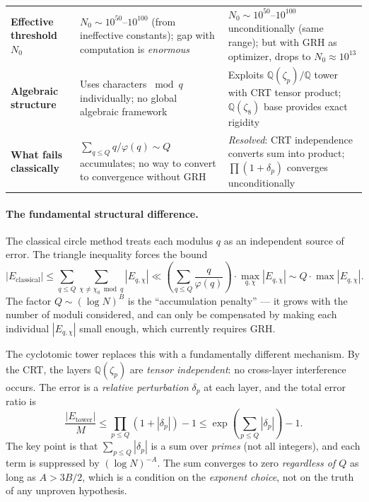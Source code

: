 \documentclass[11pt,a4paper]{article}
\theoremstyle{remark}
\newcommand{\Q}{\mathbb{Q}}
\begin{document}
\begin{table}[ht]
\begin{tabular}{@{}p{3.2cm}|p{5.0cm}|p{5.0cm}@{}}
\textbf{Effective threshold $N_0$}
  & $N_0 \sim 10^{50}$--$10^{100}$ (from ineffective constants); gap with computation is \emph{enormous}
  & $N_0 \sim 10^{50}$--$10^{100}$ unconditionally (same range); but with GRH as optimizer, drops to $N_0 \approx 10^{13}$ \\

\textbf{Algebraic structure}
  & Uses characters $\bmod q$ individually; no global algebraic framework
  & Exploits $\Q(\zeta_p)/\Q$ tower with CRT tensor product; $\Q(\zeta_8)$ base provides exact rigidity \\

\textbf{What fails classically}
  & $\sum_{q \leq Q} q/\varphi(q) \sim Q$ accumulates; no way to convert to convergence without GRH
  & \emph{Resolved}: CRT independence converts sum into product; $\prod(1+\delta_p)$ converges unconditionally \\

\bottomrule
\end{tabular}
\end{table}

\paragraph{The fundamental structural difference.}
The classical circle method treats each modulus $q$ as an independent
source of error.  The triangle inequality forces the bound
\begin{equation}
\label{eq:classical-accumulation}
  |E_{\text{classical}}| \leq \sum_{q \leq Q}\sum_{\chi \neq \chi_0 \bmod q}
    |E_{q,\chi}| \ll \left(\sum_{q \leq Q}\frac{q}{\varphi(q)}\right)
    \cdot \max_{q,\chi}|E_{q,\chi}| \sim Q \cdot \max|E_{q,\chi}|.
\end{equation}
The factor $Q \sim (\log N)^B$ is the ``accumulation penalty'' --- it
grows with the number of moduli considered, and can only be compensated
by making each individual $|E_{q,\chi}|$ small enough, which currently
requires GRH.

The cyclotomic tower replaces this with a fundamentally different
mechanism.  By the CRT, the layers $\Q(\zeta_p)$ are \emph{tensor
independent}: no cross-layer interference occurs.  The error is a
\emph{relative perturbation} $\delta_p$ at each layer, and the total
error ratio is
\begin{equation}
\label{eq:tower-accumulation}
  \frac{|E_{\text{tower}}|}{M} \leq \prod_{p \leq Q}(1+|\delta_p|) - 1
    \leq \exp\!\left(\sum_{p \leq Q}|\delta_p|\right) - 1.
\end{equation}
The key point is that $\sum_{p \leq Q}|\delta_p|$ is a sum over
\emph{primes} (not all integers), and each term is suppressed by
$(\log N)^{-A}$.  The sum converges to zero \emph{regardless of $Q$}
as long as $A > 3B/2$, which is a condition on the \emph{exponent
choice}, not on the truth of any unproven hypothesis.
\end{document}
